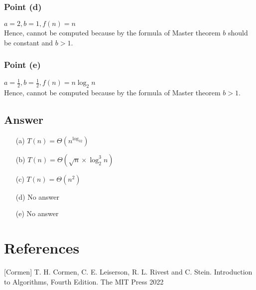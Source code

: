 \documentclass{article}
\begin{document}
\subsubsection{Point (d)}

$a = 2, b = 1, f(n) = n$ \\
Hence, cannot be computed because by the formula of Master theorem $b$ should be constant and $b > 1$.

\subsubsection{Point (e)}

$a = \frac{1}{2}, b = \frac{1}{2}, f(n) = n\log_2n$ \\
Hence, cannot be computed because by the formula of Master theorem $b > 1$.

\subsection{Answer}
\begin{itemize}
    \setlength\itemsep{0em}
    \item [(a)] $T(n) = \Theta(n^{\log_32})$
    \item [(b)] $T(n) = \Theta(\sqrt{n} \times \log^{3}_{2}n)$
    \item [(c)] $T(n) = \Theta(n^2)$
    \item [(d)] No answer
    \item [(e)] No answer
\end{itemize}

\section*{References}
[Cormen] T. H. Cormen, C. E. Leiserson, R. L. Rivest and C. Stein. Introduction to Algorithms, Fourth Edition. The MIT Press 2022
\end{document}
